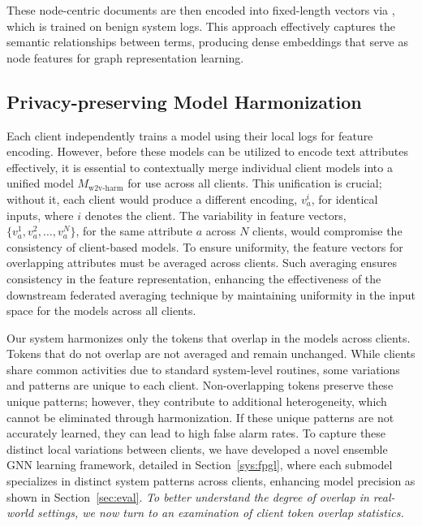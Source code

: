 These node-centric documents are then encoded into fixed-length vectors via \wordvec, which is trained on benign system logs. This approach effectively captures the semantic relationships between terms, producing dense embeddings that serve as node features for graph representation learning.

\subsection{Privacy-preserving Model Harmonization}
\label{sub:model:harmonization}



Each client independently trains a \wordvec model using their local logs for feature encoding. However, before these models can be utilized to encode text attributes effectively, it is essential to contextually merge individual client \wordvec models into a unified model \( M_{\text{w2v-harm}} \) for use across all clients. This unification is crucial; without it, each client would produce a different encoding, \(v_a^i\), for identical inputs, where \(i\) denotes the client. The variability in feature vectors, \(\{v_a^1, v_a^2, \ldots, v_a^N\}\), for the same attribute \(a\) across \(N\) clients, would compromise the consistency of client-based \gnnshort models. To ensure uniformity, the feature vectors for overlapping attributes must be averaged across clients. Such averaging ensures consistency in the feature representation, enhancing the effectiveness of the downstream federated averaging technique by maintaining uniformity in the input space for the \gnnshort models across all clients.

Our system harmonizes only the tokens that overlap in the \wordvec models across clients. Tokens that do not overlap are not averaged and remain unchanged. While clients share common activities due to standard system-level routines, some variations and patterns are unique to each client. Non-overlapping tokens preserve these unique patterns; however, they contribute to additional heterogeneity, which cannot be eliminated through harmonization. If these unique patterns are not accurately learned, they can lead to high false alarm rates. To capture these distinct local variations between clients, we have developed a novel ensemble GNN learning framework, detailed in Section~\ref{sys:fpgl}, where each submodel specializes in distinct system patterns across clients, enhancing model precision as shown in Section~\ref{sec:eval}.
\emph{To better understand the degree of overlap in real-world settings, we now turn to an examination of client token overlap statistics.}

